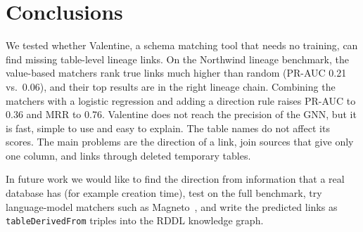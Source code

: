 \documentclass[11pt,a4paper]{article}
\begin{document}
\section{Conclusions}\label{sec:conclusions}

We tested whether Valentine, a schema matching tool that needs no training, can find missing table-level lineage
links. On the Northwind lineage benchmark, the value-based matchers rank true links much higher than random
(PR-AUC 0.21 vs.\ 0.06), and their top results are in the right lineage chain. Combining the matchers with a
logistic regression and adding a direction rule raises PR-AUC to 0.36 and MRR to 0.76. Valentine does not reach the
precision of the GNN, but it is fast, simple to use and easy to explain. The table names do not affect its scores.
The main problems are the direction of a link, join sources that give only one column, and links through deleted
temporary tables.

In future work we would like to find the direction from information that a real database has (for example creation
time), test on the full benchmark, try language-model matchers such as Magneto~\cite{liu2025magneto}, and write the
predicted links as \texttt{tableDerivedFrom} triples into the RDDL knowledge graph.



\end{document}

